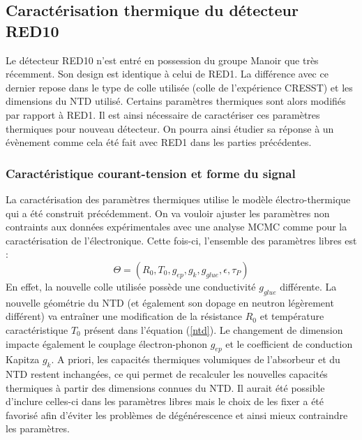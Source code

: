 \subsection{Caractérisation thermique du détecteur RED10}

Le détecteur RED10 n'est entré en possession du groupe Manoir que très récemment. Son design est identique à celui de RED1. La différence avec ce dernier repose dans le type de colle utilisée (colle de l'expérience CRESST) et les dimensions du NTD utilisé. Certains paramètres thermiques sont alors modifiés par rapport à RED1. Il est ainsi nécessaire de caractériser ces paramètres thermiques pour nouveau détecteur. On pourra ainsi étudier sa réponse à un évènement comme cela été fait avec RED1 dans les parties précédentes.

\subsubsection{Caractéristique courant-tension et forme du signal}

La caractérisation des paramètres thermiques utilise le modèle électro-thermique qui a été construit précédemment. On va vouloir ajuster les paramètres non contraints aux données expérimentales avec une analyse MCMC comme pour la caractérisation de l'électronique. Cette fois-ci, l'ensemble des paramètres libres est :
\begin{equation}
\Theta = (R_0, T_0, g_{ep}, g_k, g_{glue}, \epsilon, \tau_P)
\label{theta-red10}
\end{equation}
En effet, la nouvelle colle utilisée possède une conductivité $g_{glue}$ différente. La nouvelle géométrie du NTD (et également son dopage en neutron légèrement différent) va entraîner une modification de la résistance $R_0$ et température caractéristique $T_0$ présent dans l'équation (\ref{ntd}). Le changement de dimension impacte également le couplage électron-phonon $g_{ep}$ et le coefficient de conduction Kapitza $g_k$. A priori, les capacités thermiques volumiques de l'absorbeur et du NTD restent inchangées, ce qui permet de recalculer les nouvelles capacités thermiques à partir des dimensions connues du NTD. Il aurait été possible d'inclure celles-ci dans les paramètres libres mais le choix de les fixer a été favorisé afin d'éviter les problèmes de dégénérescence et ainsi mieux contraindre les paramètres.

